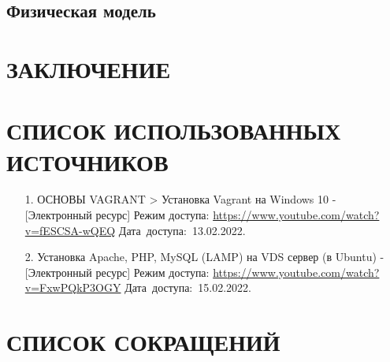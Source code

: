 \documentclass[12pt, a4paper, simple]{eskdtext}
\begin{document}
    \subsection{Физическая модель}
    \newpage

    \newpage
    \section*{ЗАКЛЮЧЕНИЕ}
    \newpage

    \newpage
    \section*{СПИСОК ИСПОЛЬЗОВАННЫХ ИСТОЧНИКОВ}
    \begin{enumerate}
        \item[1.] ОСНОВЫ VAGRANT > Установка Vagrant на Windows 10 - [Электронный ресурс]
        Режим доступа: \url{https://www.youtube.com/watch?v=fESCSA-wQEQ}
        Дата~доступа:~13.02.2022.
        \item[2.] Установка Apache, PHP, MySQL (LAMP) на VDS сервер (в Ubuntu) - [Электронный ресурс]
        Режим доступа: \url{https://www.youtube.com/watch?v=FxwPQkP3OGY}
        Дата~доступа:~15.02.2022.
    \end{enumerate}
    \newpage

    \newpage
    \section*{СПИСОК СОКРАЩЕНИЙ}
    \newpage
\end{document}
